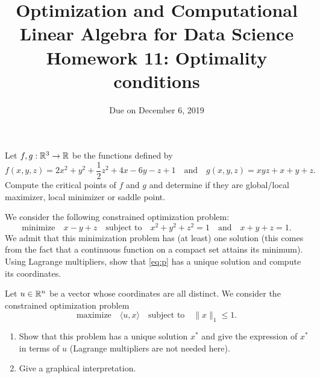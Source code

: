 \documentclass[11pt,nocut]{article}
\title{\vspace{-2.0cm}%
	Optimization and Computational Linear Algebra for Data Science\\
Homework 11: Optimality conditions}
\date{}
\author{Due on December 6, 2019}
\begin{document}
\maketitle


\vspace{1mm}

\begin{problem}[2 points]
	Let $f,g: \mathbb{R}^3 \to \mathbb{R}$ be the functions defined by
	$$
	f(x,y,z) = 2x^2 + y^2 + \frac{1}{2} z^2 + 4x - 6y - z + 1
	\quad \text{and} \quad
	g(x,y,z) = xyz + x+y+z .
	$$
	Compute the critical points of $f$ and $g$ and determine if they are global/local maximizer, local minimizer or saddle point.
\end{problem}

\vspace{5mm}

\begin{problem}[3 points]
	We consider the following constrained optimization problem:
	\begin{equation}\label{eq:p}
	\text{minimize} \quad x-y+z \quad \text{subject to} \quad x^2 + y^2 + z^2=1 \quad \text{and} \quad x+y+z=1.
	\end{equation}
	We admit that this minimization problem has (at least) one solution (this comes from the fact that a continuous function on a compact set attains its minimum).
	\\

		Using Lagrange multipliers, show that \eqref{eq:p} has a unique solution and compute its coordinates.
\end{problem}

\vspace{5mm}

\begin{problem}[2 points]
	Let $u \in \mathbb{R}^n$ be a vector whose coordinates are all distinct. We consider the constrained optimization problem
	$$
	\text{maximize} \quad \langle u ,x \rangle \quad \text{subject to} \quad \|x\|_1 \leq 1.
	$$
	\begin{enumerate}[label=\normalfont(\textbf{\alph*})]
		\item Show that this problem has a unique solution $x^*$ and give the expression of $x^*$ in terms of $u$ (Lagrange multipliers are not needed here).
		\item Give a graphical interpretation.
	\end{enumerate}
\end{problem}

\newpage
\end{document}
